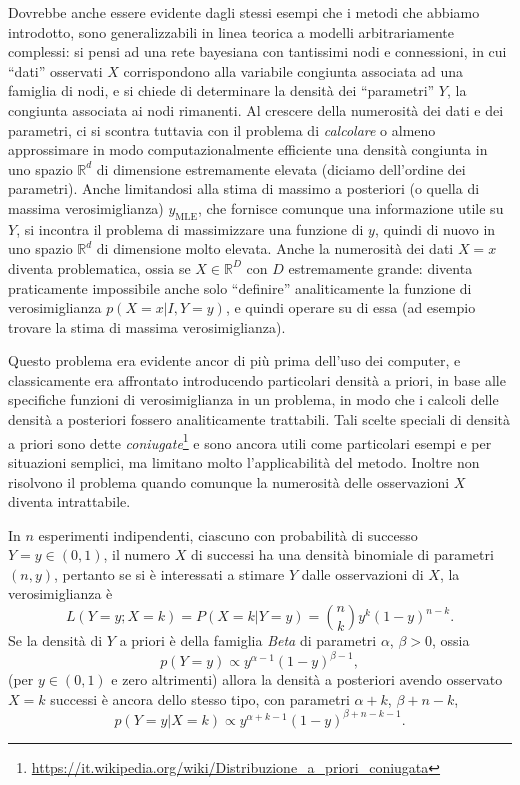 \documentclass[
  italian,
  letterpaper,
]{book}
\newcommand{\R}{\mathbb{R}}
\newcommand{\mle}{\operatorname{MLE}}
\theoremstyle{definition}
\theoremstyle{remark}
\begin{document}
Dovrebbe anche essere evidente dagli stessi esempi che i metodi che
abbiamo introdotto, sono generalizzabili in linea teorica a modelli
arbitrariamente complessi: si pensi ad una rete bayesiana con tantissimi
nodi e connessioni, in cui ``dati'' osservati \(X\) corrispondono alla
variabile congiunta associata ad una famiglia di nodi, e si chiede di
determinare la densità dei ``parametri'' \(Y\), la congiunta associata
ai nodi rimanenti. Al crescere della numerosità dei dati e dei
parametri, ci si scontra tuttavia con il problema di \emph{calcolare} o
almeno approssimare in modo computazionalmente efficiente una densità
congiunta in uno spazio \(\R^d\) di dimensione estremamente elevata
(diciamo dell'ordine dei parametri). Anche limitandosi alla stima di
massimo a posteriori (o quella di massima verosimiglianza) \(y_{\mle}\),
che fornisce comunque una informazione utile su \(Y\), si incontra il
problema di massimizzare una funzione di \(y\), quindi di nuovo in uno
spazio \(\R^d\) di dimensione molto elevata. Anche la numerosità dei
dati \(X=x\) diventa problematica, ossia se \(X \in \R^D\) con \(D\)
estremamente grande: diventa praticamente impossibile anche solo
``definire'' analiticamente la funzione di verosimiglianza
\(p(X=x| I, Y=y)\), e quindi operare su di essa (ad esempio trovare la
stima di massima verosimiglianza).

Questo problema era evidente ancor di più prima dell'uso dei computer, e
classicamente era affrontato introducendo particolari densità a priori,
in base alle specifiche funzioni di verosimiglianza in un problema, in
modo che i calcoli delle densità a posteriori fossero analiticamente
trattabili. Tali scelte speciali di densità a priori sono dette
\emph{coniugate}\footnote{\url{https://it.wikipedia.org/wiki/Distribuzione_a_priori_coniugata}}
e sono ancora utili come particolari esempi e per situazioni semplici,
ma limitano molto l'applicabilità del metodo. Inoltre non risolvono il
problema quando comunque la numerosità delle osservazioni \(X\) diventa
intrattabile.

In \(n\) esperimenti indipendenti, ciascuno con probabilità di successo
\(Y =y\in (0,1)\), il numero \(X\) di successi ha una densità binomiale
di parametri \((n,y)\), pertanto se si è interessati a stimare \(Y\)
dalle osservazioni di \(X\), la verosimiglianza è
\[  L(Y = y; X =k) = P(X=k | Y = y) = {n \choose k} y^k (1-y)^{n-k}.\]
Se la densità di \(Y\) a priori è della famiglia \emph{Beta} di
parametri \(\alpha\), \(\beta>0\), ossia
\[ p( Y = y) \propto y^{\alpha-1} (1-y)^{\beta-1},\] (per
\(y \in (0,1)\) e zero altrimenti) allora la densità a posteriori avendo
osservato \(X=k\) successi è ancora dello stesso tipo, con parametri
\(\alpha+k\), \(\beta+n-k\),
\[ p(Y= y| X=k) \propto y^{\alpha+k-1} (1-y)^{\beta+n-k-1}.\]
\end{document}

